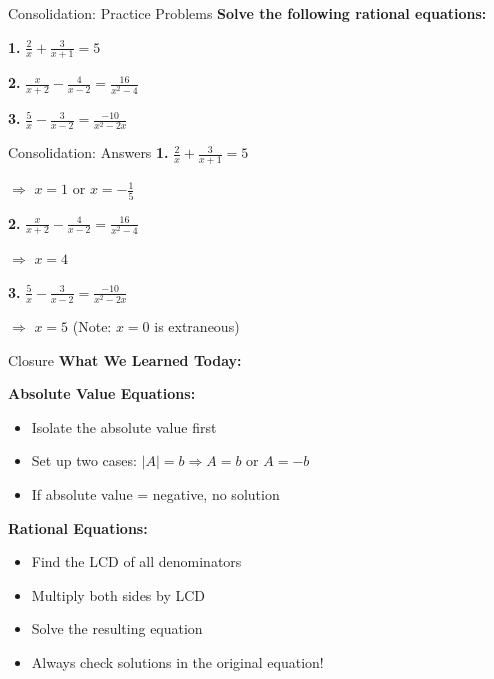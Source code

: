 \documentclass[12pt]{beamer}
\begin{document}
\begin{frame}{Consolidation: Practice Problems}
\textbf{Solve the following rational equations:}

\vspace{0.5cm}

\textbf{1.} $\displaystyle\frac{2}{x} + \frac{3}{x+1} = 5$

\vspace{0.5cm}

\textbf{2.} $\displaystyle\frac{x}{x+2} - \frac{4}{x-2} = \frac{16}{x^2-4}$

\vspace{0.5cm}

\textbf{3.} $\displaystyle\frac{5}{x} - \frac{3}{x-2} = \frac{-10}{x^2-2x}$
\end{frame}

\begin{frame}{Consolidation: Answers}
\textbf{1.} $\displaystyle\frac{2}{x} + \frac{3}{x+1} = 5$

\quad $\Rightarrow$ \quad $x = 1$ or $x = -\displaystyle\frac{1}{5}$

\vspace{0.5cm}

\textbf{2.} $\displaystyle\frac{x}{x+2} - \frac{4}{x-2} = \frac{16}{x^2-4}$

\quad $\Rightarrow$ \quad $x = 4$

\vspace{0.5cm}

\textbf{3.} $\displaystyle\frac{5}{x} - \frac{3}{x-2} = \frac{-10}{x^2-2x}$

\quad $\Rightarrow$ \quad $x = 5$ (Note: $x = 0$ is extraneous)
\end{frame}

\begin{frame}{Closure}
\Large
\textbf{What We Learned Today:}

\vspace{0.5cm}

\normalsize
\textbf{Absolute Value Equations:}
\begin{itemize}
\item Isolate the absolute value first
\item Set up two cases: $|A| = b \Rightarrow A = b$ or $A = -b$
\item If absolute value = negative, no solution
\end{itemize}

\vspace{0.5cm}

\textbf{Rational Equations:}
\begin{itemize}
\item Find the LCD of all denominators
\item Multiply both sides by LCD
\item Solve the resulting equation
\item Always check solutions in the original equation!
\end{itemize}
\end{frame}
\end{document}
